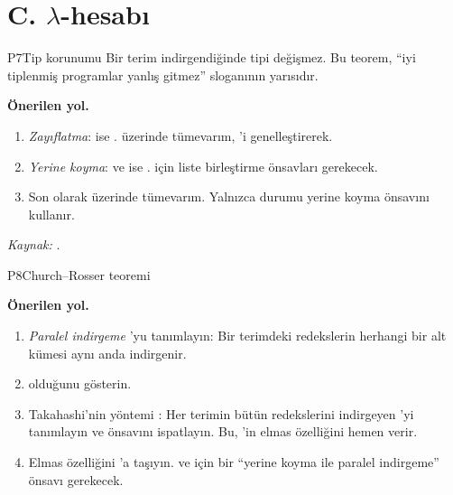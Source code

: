\section{C. $λ$-hesabı}\label{sec:projeler-c}

\begin{projekarti}{P7}{Tip korunumu}
Bir terim indirgendiğinde tipi değişmez. Bu teorem, ``iyi tiplenmiş
programlar yanlış gitmez'' sloganının yarısıdır.


\textbf{Önerilen yol.}
\begin{enumerate}[nosep]
  \item \emph{Zayıflatma}:  ise
        .
         üzerinde tümevarım, 'i genelleştirerek.
  \item \emph{Yerine koyma}:  ve
         ise .  için liste birleştirme önsavları
        gerekecek.
  \item Son olarak  üzerinde tümevarım. Yalnızca 
        durumu yerine koyma önsavını kullanır.
\end{enumerate}
\emph{Kaynak:} \citet{barendregt1984,sorensen2006}.
\end{projekarti}

\begin{projekarti}{P8}{Church--Rosser teoremi}

\textbf{Önerilen yol.}
\begin{enumerate}[nosep]
  \item \emph{Paralel indirgeme} 'yu tanımlayın: Bir
        terimdeki redekslerin herhangi bir alt kümesi aynı anda
        indirgenir.
  \item {} olduğunu gösterin.
  \item Takahashi'nin yöntemi \citep{takahashi1995}: Her terimin bütün
        redekslerini indirgeyen 'yi tanımlayın ve
         önsavını ispatlayın.
        Bu, 'in elmas özelliğini hemen verir.
  \item Elmas özelliğini 'a taşıyın.  ve 
        için bir ``yerine koyma ile paralel indirgeme'' önsavı gerekecek.
\end{enumerate}
\end{projekarti}

